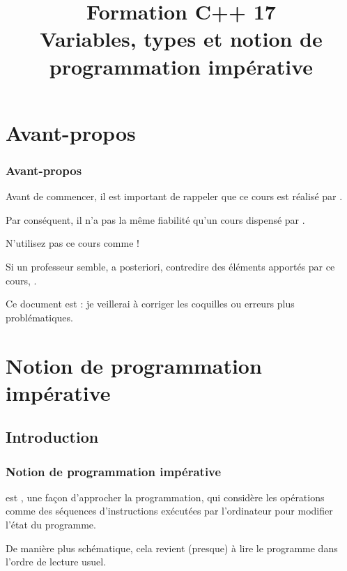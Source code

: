 \documentclass{cppcourses}
\title[Formation C++ 17]{
    Formation C++ 17 \no 01 \\
    \small{Variables, types et notion de programmation impérative}
}
\begin{document}
\frame{\titlepage}

\section{Avant-propos}

\begin{frame}

\frametitle{Avant-propos}

Avant de commencer, il est important de rappeler que ce cours est réalisé par .

Par conséquent, il n'a pas la même fiabilité qu'un cours dispensé par .

N'utilisez pas ce cours comme  !

Si un professeur semble, a posteriori, contredire des éléments apportés par ce cours, .

Ce document est  : je veillerai à corriger les coquilles ou erreurs plus problématiques.

\end{frame}

\section{Notion de programmation impérative}

\subsection{Introduction}

\begin{frame}

\frametitle{Notion de programmation impérative}

\begin{definition}
 est , une façon d'approcher la programmation, qui considère les opérations comme des séquences d'instructions exécutées par l'ordinateur pour modifier l'état du programme.
\end{definition}

De manière plus schématique, cela revient (presque) à lire le programme dans l'ordre de lecture usuel.

\end{frame}
\end{document}
